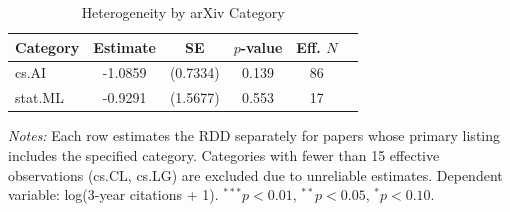 \begin{table}[htbp]
\centering
\caption{Heterogeneity by arXiv Category}
\label{tab:heterogeneity}
\begin{tabular}{lccccc}
\hline\hline
Category & Estimate & SE & $p$-value & Eff. $N$ \\
\hline
cs.AI & -1.0859 & (0.7334) & 0.139 & 86 \\
stat.ML & -0.9291 & (1.5677) & 0.553 & 17 \\
\hline\hline
\end{tabular}
\begin{minipage}{0.95\textwidth}
\footnotesize
\textit{Notes:} Each row estimates the RDD separately for papers whose primary listing includes the specified category. Categories with fewer than 15 effective observations (cs.CL, cs.LG) are excluded due to unreliable estimates. Dependent variable: log(3-year citations + 1). $^{***}p<0.01$, $^{**}p<0.05$, $^{*}p<0.10$.
\end{minipage}
\end{table}
